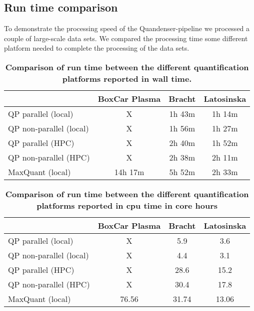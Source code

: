 \documentclass[11pt]{article}
\begin{document}
\subsection*{Run time comparison}
To demonstrate the processing speed of the Quandenser-pipeline we processed a couple of large-scale data sets. We compared the processing time some different platform needed to complete the processing of the data sets.
\begin{table}[!h]
  \begin{center}
  \caption{\textbf{Comparison of run time between the different quantification platforms reported in wall time.}}
  \label{table:walltime}
\begin{tabular}{lccc}
& BoxCar Plasma & Bracht & Latosinska \\ \hline \hline
QP parallel (local) & X & 1h 43m & 1h 14m \\
QP non-parallel (local) & X & 1h 56m & 1h 27m \\
QP parallel (HPC) & X & 2h 40m & 1h 52m \\
QP non-parallel (HPC) & X & 2h 38m & 2h 11m \\
MaxQuant (local) & 14h 17m & 5h 52m & 2h 33m \\
\end{tabular}
\end{center}
\end{table}

\begin{table}[!h]
  \begin{center}
  \caption{\textbf{Comparison of run time between the different quantification platforms reported in cpu time in core hours}}
  \label{table:cputime}
\begin{tabular}{lccc}
& BoxCar Plasma & Bracht & Latosinska \\ \hline \hline
QP parallel (local) & X & 5.9 & 3.6 \\
QP non-parallel (local) & X & 4.4 & 3.1 \\
QP parallel (HPC) & X & 28.6 & 15.2 \\ %
QP non-parallel (HPC) & X & 30.4 & 17.8 \\
MaxQuant (local) & 76.56 & 31.74 & 13.06 \\
\end{tabular}
\end{center}
\end{table}
\end{document}
